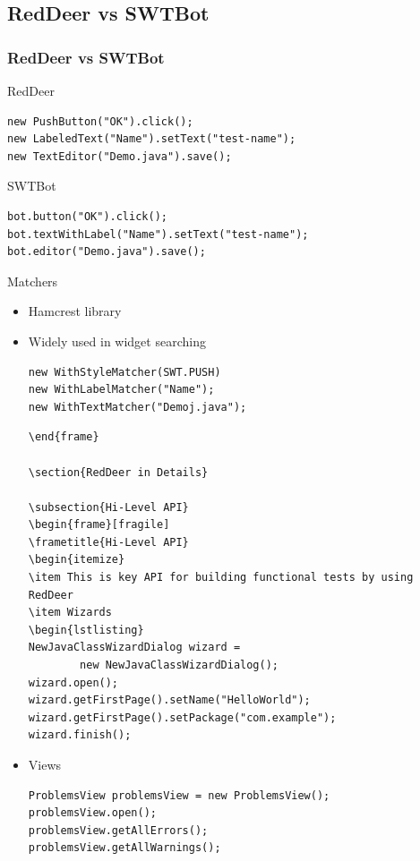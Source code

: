 \documentclass{beamer}
\begin{document}
\subsection{RedDeer vs SWTBot}
\begin{frame}[fragile]
\frametitle{RedDeer vs SWTBot}
RedDeer  
\begin{lstlisting}
new PushButton("OK").click();
new LabeledText("Name").setText("test-name");
new TextEditor("Demo.java").save();
\end{lstlisting}
SWTBot
\begin{lstlisting}
bot.button("OK").click();
bot.textWithLabel("Name").setText("test-name");
bot.editor("Demo.java").save();
\end{lstlisting}
Matchers
\begin{itemize}
\item Hamcrest library
\item Widely used in widget searching
\begin{lstlisting}
new WithStyleMatcher(SWT.PUSH)
new WithLabelMatcher("Name");
new WithTextMatcher("Demoj.java");
\end{lstlisting}
\begin{lstlisting}
\end{frame}

\section{RedDeer in Details}

\subsection{Hi-Level API}
\begin{frame}[fragile]
\frametitle{Hi-Level API}
\begin{itemize}
\item This is key API for building functional tests by using RedDeer
\item Wizards
\begin{lstlisting}
NewJavaClassWizardDialog wizard =
        new NewJavaClassWizardDialog();
wizard.open();
wizard.getFirstPage().setName("HelloWorld");
wizard.getFirstPage().setPackage("com.example");
wizard.finish();
\end{lstlisting}
\item Views
\begin{lstlisting}
ProblemsView problemsView = new ProblemsView();
problemsView.open();
problemsView.getAllErrors();
problemsView.getAllWarnings();
\end{lstlisting}
\end{itemize}
\end{frame}
\end{document}
